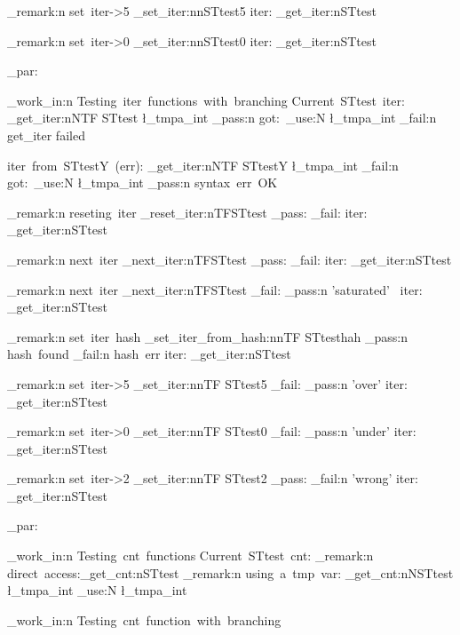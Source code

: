 \documentclass{article}
\begin{document}
\sttests_remark:n {set~iter->5} \starray_set_iter:nn{STtest}{5}
iter: \starray_get_iter:n{STtest}

\sttests_remark:n {set~iter->0} \starray_set_iter:nn{STtest}{0}
iter: \starray_get_iter:n{STtest}

\sttests_par:

\sttests_work_in:n {Testing~iter~functions~with~branching}
Current~STtest~iter: 
\starray_get_iter:nNTF {STtest} \l_tmpa_int 
  {\sttests_pass:n {got:~\int_use:N \l_tmpa_int}}
  {\sttests_fail:n {get_iter failed}}

iter~from~STtestY~(err): 
\starray_get_iter:nNTF {STtestY} \l_tmpa_int 
  {\sttests_fail:n {got:~\int_use:N \l_tmpa_int}}
  {\sttests_pass:n {syntax~err~OK}}

\sttests_remark:n {reseting~iter} 
\starray_reset_iter:nTF{STtest}
  {\sttests_pass:}
  {\sttests_fail:}
iter: \starray_get_iter:n{STtest}

\sttests_remark:n {next~iter} 
\starray_next_iter:nTF{STtest}
  {\sttests_pass:}
  {\sttests_fail:}
iter: \starray_get_iter:n{STtest}

\sttests_remark:n {next~iter} 
\starray_next_iter:nTF{STtest}
  {\sttests_fail:}
  {\sttests_pass:n {'saturated'}~}
iter: \starray_get_iter:n{STtest}

\sttests_remark:n {set~iter~hash} 
\starray_set_iter_from_hash:nnTF {STtest}{hah}
  {\sttests_pass:n {hash~found}}
  {\sttests_fail:n {hash~err}}
iter: \starray_get_iter:n{STtest}

\sttests_remark:n {set~iter->5} 
\starray_set_iter:nnTF {STtest}{5}
  {\sttests_fail:}
  {\sttests_pass:n {'over'}}
iter: \starray_get_iter:n{STtest}

\sttests_remark:n {set~iter->0} 
\starray_set_iter:nnTF {STtest}{0}
  {\sttests_fail:}
  {\sttests_pass:n {'under'}}
iter: \starray_get_iter:n{STtest}

\sttests_remark:n {set~iter->2} 
\starray_set_iter:nnTF {STtest}{2}
  {\sttests_pass:}
  {\sttests_fail:n {'wrong'}}
iter: \starray_get_iter:n{STtest}

\sttests_par:

\sttests_work_in:n {Testing~cnt~functions}
Current~STtest~cnt: 
\sttests_remark:n {direct~access:\starray_get_cnt:n{STtest}}
\sttests_remark:n {using~a~tmp~var: \starray_get_cnt:nN{STtest} \l_tmpa_int \int_use:N \l_tmpa_int}

\sttests_work_in:n {Testing~cnt~function~with~branching}

\end{document}
